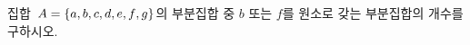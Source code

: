 집합~$A=\{a{,}\mkern3mu\mathopen{}b{,}\mkern3mu\mathopen{}c{,}\mkern3mu\mathopen{}d{,}\mkern3mu\mathopen{}e{,}\mkern3mu\mathopen{}f{,}\mkern3mu\mathopen{}g\}$의 부분집합 중 $b$ 또는 $f$를 원소로 갖는 부분집합의 개수를 구하시오.
